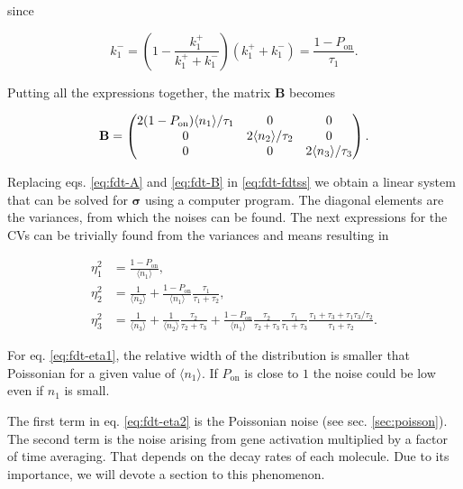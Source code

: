 since

\begin{equation*}
  k_1^- = \left(1-\frac{k_1^+}{k_1^++k_1^-}\right)(k_1^++k_1^-)=\frac{1-P_\text{on}}{\tau_1}.
\end{equation*}

Putting all the expressions together, the matrix $\mathbf{B}$ becomes

\begin{equation}
  \label{eq:fdt-B}
  \mathbf{B} = 
  \begin{pmatrix}
    2(1-P_\text{on})\langle n_1\rangle/\tau_1 & 0 & 0 \\
    0 & 2\langle n_2\rangle/\tau_2 & 0 \\
    0 & 0 & 2\langle n_3\rangle/\tau_3
  \end{pmatrix}.\\
\end{equation}

Replacing eqs. \eqref{eq:fdt-A} and \eqref{eq:fdt-B} in \eqref{eq:fdt-fdtss} we obtain a linear system that can be solved for $\mathbf{\sigma}$ using a computer program. The diagonal elements are the variances, from which the noises can be found. The next expressions for the CVs can be trivially found from the variances and means resulting in

\begin{align}
  \eta_1^2 &= \frac{1-P_\text{on}}{\langle n_1\rangle}, \label{eq:fdt-eta1}\\
  \eta_2^2 &= \frac{1}{\langle n_2\rangle}+\frac{1-P_\text{on}}{\langle n_1\rangle}\frac{\tau_1}{\tau_1+\tau_2}, \label{eq:fdt-eta2}\\
  \eta_3^2 &= \frac{1}{\langle n_3\rangle} + \frac{1}{\langle n_2\rangle}\frac{\tau_2}{\tau_2+\tau_3}+\frac{1-P_\text{on}}{\langle n_1\rangle}\frac{\tau_2}{\tau_2+\tau_3}\frac{\tau_1}{\tau_1+\tau_3}\frac{\tau_1+\tau_3+\tau_1\tau_3/\tau_2}{\tau_1+\tau_2}. \label{eq:fdt-eta3}
\end{align}

For eq. \eqref{eq:fdt-eta1}, the relative width of the distribution is smaller that Poissonian for a given value of $\langle n_1\rangle$. If $P_\text{on}$ is close to $1$ the noise could be low even if $n_1$ is small.

The first term in eq. \eqref{eq:fdt-eta2} is the Poissonian noise (see sec. \ref{sec:poisson}). The second term is the noise arising from gene activation multiplied by a factor of time averaging. That depends on the decay rates of each molecule. Due to its importance, we will devote a section to this phenomenon.

